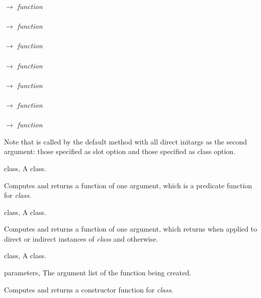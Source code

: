 \begin{optDefinition}
\begin{table}
\begin{tabbing}
    \>\>\>\>
    $\rightarrow$ {\em function}\\
    \\
    \>\>\>\>
    $\rightarrow$ {\em function}\\
    \>\\
    \>\>\>\>\>
    $\rightarrow$ {\em function}\\
    \>\>\\
    \>\>\>\>\>\>
    $\rightarrow$ {\em function}\\
    \\
    \>\>\>\>
    $\rightarrow$ {\em function}\\
    \>\\
    \>\>\>\>\>
    $\rightarrow$ {\em function}\\
    \>\>\\
    \>\>\>\>\>\>
    $\rightarrow$ {\em function}%
\end{tabbing}%
\end{table}%
%
Note that  is called by the default
 method with all direct initargs as the second argument:
those specified as slot option and those specified as class option.

%
\begin{genericargs}
    \item[class, \classref{class}] A class.
\end{genericargs}
%
\result%
Computes and returns a function of one argument, which is a predicate
function for {\em class}.

%
\begin{specargs}
    \item[class, \classref{class}] A class.
\end{specargs}
%
\result%
Computes and returns a function of one argument, which returns \true{} when applied
to direct or indirect instances of {\em class} and \nil{}\/ otherwise.

%
\begin{genericargs}
    \item[class, \classref{class}] A class.
    \item[parameters, \classref{list}] The argument list of the function being
    created.
\end{genericargs}
%
\result%
Computes and returns a constructor function for {\em class}.


\end{optDefinition}
